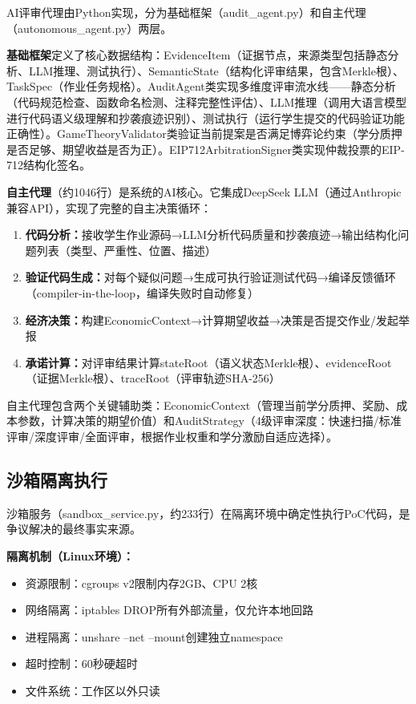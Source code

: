 \documentclass[10.5pt,compsoc]{CjC}
\begin{document}
AI评审代理由Python实现，分为基础框架（audit\_agent.py）和自主代理（autonomous\_agent.py）两层。

\textbf{基础框架}定义了核心数据结构：EvidenceItem（证据节点，来源类型包括静态分析、LLM推理、测试执行）、SemanticState（结构化评审结果，包含Merkle根）、TaskSpec（作业任务规格）。AuditAgent类实现多维度评审流水线——静态分析（代码规范检查、函数命名检测、注释完整性评估）、LLM推理（调用大语言模型进行代码语义级理解和抄袭痕迹识别）、测试执行（运行学生提交的代码验证功能正确性）。GameTheoryValidator类验证当前提案是否满足博弈论约束（学分质押是否足够、期望收益是否为正）。EIP712ArbitrationSigner类实现仲裁投票的EIP-712结构化签名。

\textbf{自主代理}（约1046行）是系统的AI核心。它集成DeepSeek LLM（通过Anthropic兼容API），实现了完整的自主决策循环：
\begin{enumerate}[nosep]
  \item \textbf{代码分析：}接收学生作业源码→LLM分析代码质量和抄袭痕迹→输出结构化问题列表（类型、严重性、位置、描述）
  \item \textbf{验证代码生成：}对每个疑似问题→生成可执行验证测试代码→编译反馈循环（compiler-in-the-loop，编译失败时自动修复）
  \item \textbf{经济决策：}构建EconomicContext→计算期望收益→决策是否提交作业/发起举报
  \item \textbf{承诺计算：}对评审结果计算stateRoot（语义状态Merkle根）、evidenceRoot（证据Merkle根）、traceRoot（评审轨迹SHA-256）
\end{enumerate}

自主代理包含两个关键辅助类：EconomicContext（管理当前学分质押、奖励、成本参数，计算决策的期望价值）和AuditStrategy（4级评审深度：快速扫描/标准评审/深度评审/全面评审，根据作业权重和学分激励自适应选择）。

\subsection{沙箱隔离执行}

沙箱服务（sandbox\_service.py，约233行）在隔离环境中确定性执行PoC代码，是争议解决的最终事实来源。

\textbf{隔离机制（Linux环境）：}
\begin{itemize}[nosep]
  \item 资源限制：cgroups v2限制内存2GB、CPU 2核
  \item 网络隔离：iptables DROP所有外部流量，仅允许本地回路
  \item 进程隔离：unshare --net --mount创建独立namespace
  \item 超时控制：60秒硬超时
  \item 文件系统：工作区以外只读
\end{itemize}
\end{document}
